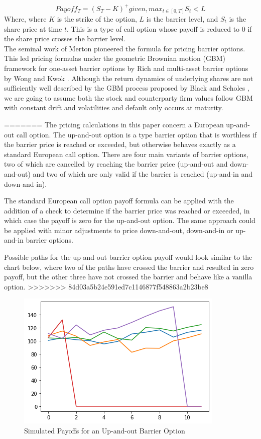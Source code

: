 \documentclass[11pt]{article}
\begin{document}
\[
Payoff_T= (S_T - K)^+ given, max_{t \in [0,T]} S_t < L
\]
Where, where $K$ is the strike of the option, $L$ is the barrier level, and $S_t$ is the share price at time $t$.  This is a type of call option whose payoff is reduced to 0 if the share price crosses the barrier level. \\

The seminal work of Merton \cite{Merton1} pioneered the formula for pricing barrier options.  This led pricing formulas under the geometric Brownian motion (GBM) framework for one-asset barrier options by Rich \cite{RD1} and multi-asset barrier options by Wong and Kwok \cite{WK1}. Although the return dynamics of underlying shares are not sufficiently well described by the GBM process proposed by Black and Scholes \cite{BS1}, we are going to assume both the stock and counterparty firm values follow GBM  with constant drift and volatilities and default only occurs at maturity.

=======
The pricing calculations in this paper concern a European up-and-out call option. The up-and-out option is a type barrier option that is worthless if the barrier price is reached or exceeded, but otherwise behaves exactly as a standard European call option. There are four main variants of barrier options, two of which are cancelled by reaching the barrier price (up-and-out and down-and-out) and two of which are only valid if the barrier is reached (up-and-in and down-and-in).

The standard European call option payoff formula can be applied with the addition of a check to determine if the barrier price was reached or exceeded, in which case the payoff is zero for the up-and-out option. The same approach could be applied with minor adjustments to price down-and-out, down-and-in or up-and-in barrier options.

Possible paths for the up-and-out barrier option payoff would look similar to the chart below, where two of the paths have crossed the barrier and resulted in zero payoff, but the other three have not crossed the barrier and behave like a vanilla option.
>>>>>>> 84d03a5b24e591ed7c1146877f548863a2b23be8

\begin{figure}
    \centering
    \caption{Simulated Payoffs for an Up-and-out Barrier Option}
    \includegraphics{images/barrier-example.png}
\end{figure}
\end{document}
